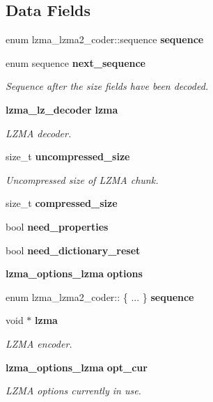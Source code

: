 \subsection*{Data Fields}
\begin{DoxyCompactItemize}
\item 
\mbox{\label{structlzma__lzma2__coder_a9e3b593bbaf166bd23061c2413fc2a38}} 
enum lzma\+\_\+lzma2\+\_\+coder\+::sequence {\bfseries sequence}
\item 
enum sequence \textbf{ next\+\_\+sequence}
\begin{DoxyCompactList}\small\item\em Sequence after the size fields have been decoded. \end{DoxyCompactList}\item 
\textbf{ lzma\+\_\+lz\+\_\+decoder} \textbf{ lzma}
\begin{DoxyCompactList}\small\item\em L\+Z\+MA decoder. \end{DoxyCompactList}\item 
size\+\_\+t \textbf{ uncompressed\+\_\+size}
\begin{DoxyCompactList}\small\item\em Uncompressed size of L\+Z\+MA chunk. \end{DoxyCompactList}\item 
size\+\_\+t \textbf{ compressed\+\_\+size}
\item 
bool \textbf{ need\+\_\+properties}
\item 
bool \textbf{ need\+\_\+dictionary\+\_\+reset}
\item 
\mbox{\label{structlzma__lzma2__coder_abda90d419c7d19a6017be58050ee3362}} 
\textbf{ lzma\+\_\+options\+\_\+lzma} {\bfseries options}
\item 
\mbox{\label{structlzma__lzma2__coder_ae297df7d587247891e52656f15ab4093}} 
enum lzma\+\_\+lzma2\+\_\+coder\+:: \{ ... \}  {\bfseries sequence}
\item 
void $\ast$ \textbf{ lzma}
\begin{DoxyCompactList}\small\item\em L\+Z\+MA encoder. \end{DoxyCompactList}\item 
\textbf{ lzma\+\_\+options\+\_\+lzma} \textbf{ opt\+\_\+cur}
\begin{DoxyCompactList}\small\item\em L\+Z\+MA options currently in use. \end{DoxyCompactList}\item 

\end{DoxyCompactItemize}
